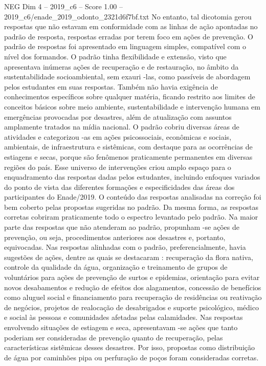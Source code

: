 \begin{textsample}{NEG Dim 4 – 2019\_c6 – Score 1.00 – 2019\_c6/enade\_2019\_odonto\_2321d6f7bf.txt}
No entanto, tal dicotomia gerou respostas que não estavam em conformidade com as linhas de ação apontadas no padrão de resposta, respostas erradas por terem foco em ações de prevenção.
O padrão de respostas foi apresentado em linguagem simples, compatível com o nível dos formandos.
O padrão tinha flexibilidade e extensão, visto que apresentava inúmeras ações de recuperação e de restauração, no âmbito da sustentabilidade socioambiental, sem exauri -las, como passíveis de abordagem pelos estudantes em suas respostas.
Também não havia exigência de conhecimentos específicos sobre qualquer matéria, ficando restrito aos limites de conceitos básicos sobre meio ambiente, sustentabilidade e intervenção humana em emergências provocadas por desastres, além de atualização com assuntos amplamente tratados na mídia nacional.
O padrão cobriu diversas áreas de atividades e categorizou -as em ações psicossociais, econômicas e sociais, ambientais, de infraestrutura e sistêmicas, com destaque para as ocorrências de estiagens e secas, porque são fenômenos praticamente permanentes em diversas regiões do país.
Esse universo de intervenções criou amplo espaço para o enquadramento das respostas dadas pelos estudantes, incluindo enfoques variados do ponto de vista das diferentes formações e especificidades das áreas dos participantes do Enade/2019.
O conteúdo das respostas analisadas na correção foi bem coberto pelas propostas sugeridas no padrão.
Da mesma forma, as respostas corretas cobriram praticamente todo o espectro levantado pelo padrão.
Na maior parte das respostas que não atenderam ao padrão, propunham -se ações de prevenção, ou seja, procedimentos anteriores aos desastres e, portanto, equivocadas.
Nas respostas alinhadas com o padrão, preferencialmente, havia sugestões de ações, dentre as quais se destacaram : recuperação da flora nativa, controle da qualidade da água, organização e treinamento de grupos de voluntários para ações de prevenção de surtos e epidemias, orientação para evitar novos desabamentos e redução de efeitos dos alagamentos, concessão de benefícios como aluguel social e financiamento para recuperação de residências ou reativação de negócios, projetos de realocação de desabrigados e suporte psicológico, médico e social às pessoas e comunidades afetadas pelas calamidades.
Nas respostas envolvendo situações de estiagem e seca, apresentavam -se ações que tanto poderiam ser consideradas de prevenção quanto de recuperação, pelas características sistêmicas desses desastres.
Por isso, propostas como distribuição de água por caminhões pipa ou perfuração de poços foram consideradas corretas.

\end{textsample}
